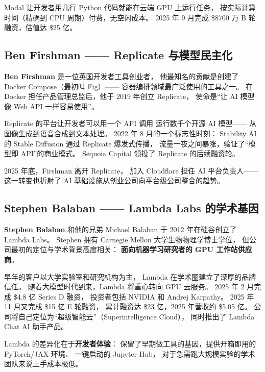 Modal 让开发者用几行 Python 代码就能在云端 GPU 上运行任务，
按实际计算时间（精确到 CPU 周期）付费，无空闲成本。
2025 年 9 月完成 \$8700 万 B 轮融资，估值达 \$25 亿。

\subsection{Ben Firshman —— Replicate 与模型民主化}
\label{subsec:replicate}

\textbf{Ben Firshman} 是一位英国开发者工具创业者，
他最知名的贡献是创建了 Docker Compose（最初叫 Fig）——
容器编排领域最广泛使用的工具之一。
在 Docker 担任产品管理总监后，他于 2019 年创立 Replicate，
使命是``让 AI 模型像 Web API 一样容易使用''。

Replicate 的平台让开发者可以用一个 API 调用
运行数千个开源 AI 模型——
从图像生成到语音合成到文本处理。
2022 年 8 月的一个标志性时刻：
Stability AI 的 Stable Diffusion 通过 Replicate 爆发式传播，
流量一夜之间暴涨，验证了``模型即 API''的商业模式。
Sequoia Capital 领投了 Replicate 的后续融资轮。

2025 年底，Firshman 离开 Replicate，
加入 Cloudflare 担任 AI 平台负责人——
这一转变也折射了 AI 基础设施从创业公司向平台级公司整合的趋势。

\subsection{Stephen Balaban —— Lambda Labs 的学术基因}
\label{subsec:lambda}

\textbf{Stephen Balaban} 和他的兄弟 Michael Balaban
于 2012 年在硅谷创立了 Lambda Labs。
Stephen 拥有 Carnegie Mellon 大学生物物理学博士学位，
但公司最初的定位与学术背景高度相关：
\textbf{面向机器学习研究者的 GPU 工作站供应商}。

早年的客户以大学实验室和研究机构为主，
Lambda 在学术圈建立了深厚的品牌信任。
随着大模型时代到来，Lambda 将重心转向 GPU 云服务。
2025 年 2 月完成 \$4.8 亿 Series D 融资，
投资者包括 NVIDIA 和 Andrej Karpathy。
2025 年 11 月又完成 \$15 亿 E 轮融资，
累计融资达 \$23 亿，2025 年营收约 \$5.05 亿。
公司将自己定位为``超级智能云''（Superintelligence Cloud），
同时推出了 Lambda Chat AI 助手产品。

Lambda 的差异化在于\textbf{开发者体验}：
保留了早期做工具的基因，提供开箱即用的 PyTorch/JAX 环境、
一键启动的 Jupyter Hub，
对于急需跑大规模实验的学术团队来说上手成本极低。

